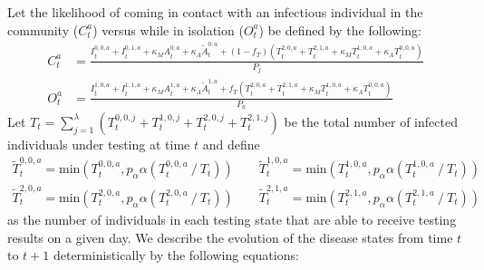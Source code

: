 \documentclass{article}
\begin{document}
Let the likelihood of coming in contact with an infectious individual in the community ($C^a_t$) versus while in isolation ($O^a_t$) be defined by the following:
\begin{align*}
C^a_t &= \frac{I^{0,0,a}_t + I^{0,1,a}_t + \kappa_M A^{0,a}_t + \kappa_A \tilde{A}^{0,a}_t + (1-f_T)\left(T^{2,0,a}_t + T^{2,1,a}_t + \kappa_M T^{1,0,a}_t + \kappa_A T^{0,0,a}_t\right)}{P_j} \\
O^a_t &= \frac{I^{1,0,a}_t + I^{1,1,a}_t + \kappa_M A^{1,a}_t + \kappa_A \tilde{A}^{1,a}_t + f_T\left(T^{2,0,a}_t + T^{2,1,a}_t + \kappa_M T^{1,0,a}_t + \kappa_A T^{0,0,a}_t \right)}{P_a}
\end{align*}
Let $T_t = \sum_{j=1}^{\lambda} \left(T^{0,0,j}_t + T^{1,0,j}_t + T^{2,0,j}_t + T^{2,1,j}_t\right)$ be the total number of infected individuals under testing at time $t$ and define
\[
\begin{array}{cc}
\tilde{T}^{0,0,a}_t = \mbox{min}\left(T^{0,0,a}_t, p_\alpha \alpha(T^{0,0,a}_t \mathbin{/} T_t)\right) \qquad \tilde{T}^{1,0,a}_t = \mbox{min}\left(T^{1,0,a}_t, p_\alpha \alpha(T^{1,0,a}_t \mathbin{/} T_t)\right) \\
\tilde{T}^{2,0,a}_t = \mbox{min}\left(T^{2,0,a}_t, p_\alpha \alpha(T^{2,0,a}_t \mathbin{/} T_t)\right) \qquad \tilde{T}^{2,1,a}_t = \mbox{min}\left(T^{2,1,a}_t, p_\alpha \alpha(T^{2,1,a}_t \mathbin{/} T_t)\right)
\end{array}
\]
as the number of individuals in each testing state that are able to receive testing results on a given day. We describe the evolution of the disease states from time $t$ to $t + 1$ deterministically by the following equations:
\end{document}
